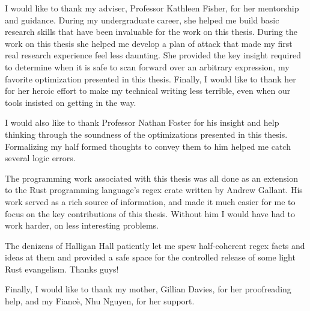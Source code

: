 \begin{thesisacknowledgments}

I would like to thank my adviser, Professor Kathleen Fisher, for her
mentorship and guidance. During my undergraduate career, she helped
me build basic research skills that have been invaluable for the
work on this thesis. During the work on this thesis she helped
me develop a plan of attack that made my first real research experience
feel less daunting. She provided the key insight required to
determine when it is safe to scan forward over an arbitrary expression,
my favorite optimization presented in this thesis. Finally,
I would like to thank her for her heroic effort to make my technical
writing less terrible, even when our tools insisted on getting in
the way.

I would also like to thank Professor Nathan Foster for his insight and 
help thinking through the soundness of the optimizations presented
in this thesis. Formalizing my half formed thoughts to convey them
to him helped me catch several logic errors.

The programming work associated with this thesis was all done as
an extension to the Rust programming language's regex crate written
by Andrew Gallant. His work served as a rich source of information,
and made it much easier for me to focus on the key contributions
of this thesis. Without him I would have had to work harder, on
less interesting problems.

The denizens of Halligan Hall patiently let me spew half-coherent
regex facts and ideas at them and provided a safe space for
the controlled release of some light Rust evangelism.
Thanks guys!

Finally, I would like to thank my mother, Gillian Davies, for 
her proofreading help, and my Fianc\`e, Nhu Nguyen, for her
support.

\end{thesisacknowledgments}
